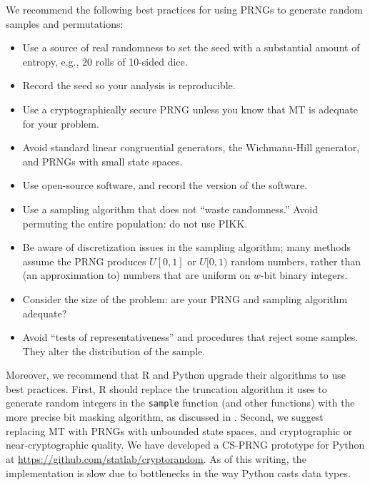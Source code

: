 \documentclass[graybox]{svmult}
\begin{document}
We recommend the following best practices for using PRNGs to generate random samples and permutations:
\begin{itemize}
\item Use a source of real randomness to set the seed with a substantial amount of entropy, e.g., 20 rolls of 10-sided dice.
\item Record the seed so your analysis is reproducible.
\item Use a cryptographically secure PRNG unless you know that MT is adequate for your problem.
\item Avoid standard linear congruential generators, the Wichmann-Hill generator, and PRNGs with small state spaces.
\item Use open-source software, and record the version of the software.
\item Use a sampling algorithm that does not ``waste randomness.'' Avoid permuting the entire population: do not use PIKK.
\item Be aware of discretization issues in the sampling algorithm; many methods assume the PRNG produces $U[0,1]$ or $U[0,1)$ random numbers, rather than (an approximation to) numbers that are uniform on $w$-bit binary integers.
\item Consider the size of the problem: are your PRNG and sampling algorithm adequate?
\item Avoid ``tests of representativeness'' and procedures that reject some samples. They alter the distribution of the sample.
\end{itemize}


Moreover, we recommend that R and Python upgrade their algorithms to use best practices.
First, R should replace the truncation algorithm it uses to generate random integers in the \texttt{sample} function (and other functions) with the more precise bit masking algorithm, as discussed
in \cite{ottoboniStark18}.
Second, we suggest replacing MT with PRNGs with unbounded state spaces, and cryptographic or near-cryptographic quality.
We have developed a CS-PRNG prototype for Python at \url{https://github.com/statlab/cryptorandom}.
As of this writing, the implementation is slow due to bottlenecks in the way Python casts data types.




%



\end{document}
